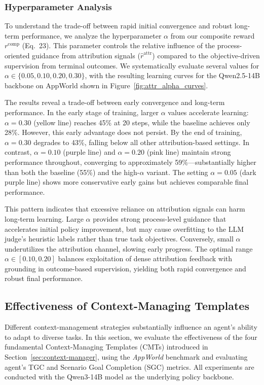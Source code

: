 \subsubsection{Hyperparameter Analysis}
\label{sec:attr_hyperparameter}
To understand the trade-off between rapid initial convergence and robust long-term performance, we analyze the hyperparameter $\alpha$ from our composite reward $r^{\text{comp}}$ (Eq.~23). This parameter controls the relative influence of the process-oriented guidance from attribution signals ($\hat{r}^{\text{attr}}$) compared to the objective-driven supervision from terminal outcomes. We systematically evaluate several values for $\alpha \in \{0.05, 0.10, 0.20, 0.30\}$, with the resulting learning curves for the Qwen2.5-14B backbone on AppWorld shown in Figure~\ref{fig:attr_alpha_curves}.

The results reveal a trade-off between early convergence and long-term performance. In the early stage of training, larger $\alpha$ values accelerate learning: $\alpha{=}0.30$ (yellow line) reaches 45\% at 20 steps, while the baseline achieves only 28\%. However, this early advantage does not persist. By the end of training, $\alpha{=}0.30$ degrades to 43\%, falling below all other attribution-based settings. In contrast, $\alpha{=}0.10$ (purple line) and $\alpha{=}0.20$ (pink line) maintain strong performance throughout, converging to approximately 59\%—substantially higher than both the baseline (55\%) and the high-$\alpha$ variant. The setting $\alpha{=}0.05$ (dark purple line) shows more conservative early gains but achieves comparable final performance.

This pattern indicates that excessive reliance on attribution signals can harm long-term learning. Large $\alpha$ provides strong process-level guidance that accelerates initial policy improvement, but may cause overfitting to the LLM judge's heuristic labels rather than true task objectives. Conversely, small $\alpha$ underutilizes the attribution channel, slowing early progress. The optimal range $\alpha{\in}[0.10, 0.20]$ balances exploitation of dense attribution feedback with grounding in outcome-based supervision, yielding both rapid convergence and robust final performance.


\subsection{Effectiveness of Context-Managing Templates}\label{sec:experiment_cmt}

Different context-management strategies substantially influence an agent’s ability to adapt to diverse tasks. 
In this section, we evaluate the effectiveness of the four fundamental Context-Managing Templates (CMTs) introduced in Section~\ref{sec:context-manager}, using the \textit{AppWorld} benchmark and evaluating agent's TGC and Scenario Goal Completion (SGC) metrics. 
All experiments are conducted with the Qwen3-14B model as the underlying policy backbone.

